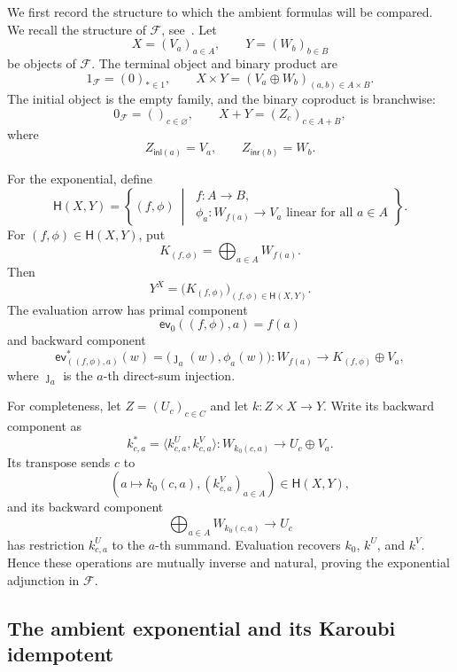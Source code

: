 \documentclass[runningheads,envcountsame]{llncs}
\begin{document}
We first record the structure to which the ambient formulas will be compared.
We recall the structure of $\mathcal F$, see~\cite[Sections~9.2 and~10.2]{LucatelliNunesVakar2023}.
Let
$$
X=(V_a)_{a\in A},
\qquad
Y=(W_b)_{b\in B}
$$
be objects of $\mathcal F$.
The terminal object and binary product are
$$
1_{\mathcal F}=(0)_{*\in1},
\qquad
X\times Y=(V_a\oplus W_b)_{(a,b)\in A\times B}.
$$
The initial object is the empty family, and the binary coproduct is
branchwise:
$$
0_{\mathcal F}=()_{c\in\varnothing},
\qquad
X+Y=(Z_c)_{c\in A+B},
$$
where
$$
Z_{\mathsf{inl}(a)}=V_a,
\qquad
Z_{\mathsf{inr}(b)}=W_b.
$$

For the exponential, define
$$
\mathsf H(X,Y)=
\left\{
(f,\phi)\ \middle|\
\begin{array}{l}
	f:A\to B,\\[-1mm]
	\phi_a:W_{f(a)}\to V_a\text{ linear for all }a\in A
\end{array}
\right\}.
$$
For $(f,\phi)\in\mathsf H(X,Y)$, put
$$
K_{(f,\phi)}=\bigoplus_{a\in A}W_{f(a)}.
$$
Then
\begin{equation}
	Y^X=
	\bigl(K_{(f,\phi)}\bigr)_{(f,\phi)\in\mathsf H(X,Y)}.
	\label{eq:fam-exponential}
\end{equation}
The evaluation arrow has primal component
$$
\mathsf{ev}_0((f,\phi),a)=f(a)
$$
and backward component
\begin{equation}
	\mathsf{ev}_{((f,\phi),a)}^*(w)
	=
	\bigl(\jmath_a(w),\phi_a(w)\bigr):
	W_{f(a)}\longrightarrow K_{(f,\phi)}\oplus V_a,
	\label{eq:fam-evaluation}
\end{equation}
where $\jmath_a$ is the $a$-th direct-sum injection.

For completeness, let $Z=(U_c)_{c\in C}$ and let
$k:Z\times X\to Y$. Write its backward component as
$$
k_{c,a}^*=\langle k^U_{c,a},k^V_{c,a}\rangle:
W_{k_0(c,a)}\longrightarrow U_c\oplus V_a.
$$
Its transpose sends $c$ to
$$
\left(
a\longmapsto k_0(c,a),
(k^V_{c,a})_{a\in A}
\right)\in\mathsf H(X,Y),
$$
and its backward component
$$
\bigoplus_{a\in A}W_{k_0(c,a)}\longrightarrow U_c
$$
has restriction $k^U_{c,a}$ to the $a$-th summand. Evaluation recovers
$k_0$, $k^U$, and $k^V$. Hence these operations are mutually inverse and
natural, proving the exponential adjunction in $\mathcal F$.





\subsection{The ambient exponential and its Karoubi idempotent}
\end{document}

